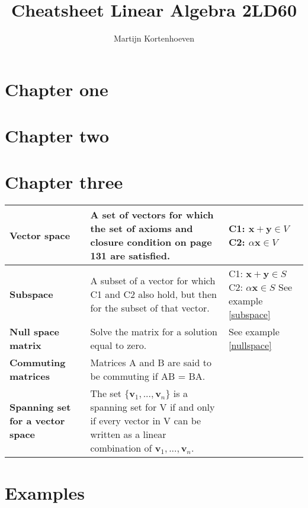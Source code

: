 \documentclass{article}
\title{Cheatsheet Linear Algebra 2LD60}
\author{Martijn Kortenhoeven}
\begin{document}
\maketitle

\section{Chapter one}
\section{Chapter two}
\section{Chapter three}


\begin{tabularx}{\textwidth}{p{40mm}Xp{55mm}}
\textbf{Vector space} & A set of vectors for which the set of axioms and closure condition on page 131 are satisfied. & C1: $\textbf{x} + \textbf{y} \in V$ \newline C2: $\alpha \textbf{x} \in V$ \\

\hline
\textbf{Subspace} & A subset of a vector for which C1 and C2 also hold, but then for the subset of that vector. & C1: $\textbf{x} + \textbf{y} \in S$ \newline C2: $\alpha \textbf{x} \in S$ \newline See example \ref{subspace} \\

\hline
\textbf{Null space matrix} & Solve the matrix for a solution equal to zero. & See example \ref{nullspace} \\

\hline
\textbf{Commuting matrices} & Matrices A and B are said to be commuting if AB = BA. \\

\hline
\textbf{Spanning set for a \newline vector space} & The set $\{\textbf{v}_1, ..., \textbf{v}_n\}$ is a spanning set for V if and only if every vector in V can be written as a linear combination of $\textbf{v}_1,..., \textbf{v}_n$.

\end{tabularx}

\section{Examples}
\end{document}

